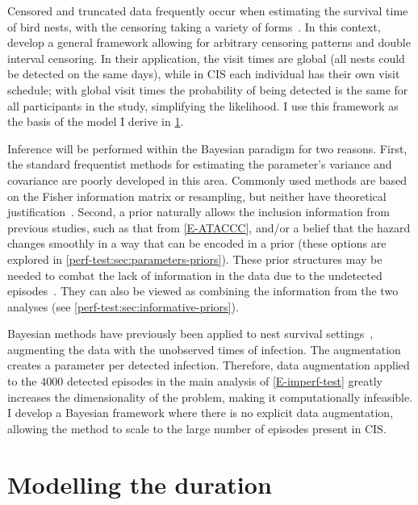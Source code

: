 \documentclass[thesis.tex]{subfiles}
\begin{document}
Censored and truncated data frequently occur when estimating the survival time of bird nests, with the censoring taking a variety of forms~\autocite{heiseyABCs}.
In this context, \textcite{heiseyModelling} develop a general framework allowing for arbitrary censoring patterns and double interval censoring.
In their application, the visit times are global (all nests could be detected on the same days), while in CIS each individual has their own visit schedule; with global visit times the probability of being detected is the same for all participants in the study, simplifying the likelihood.
I use this framework as the basis of the model I derive in \cref{perf-test:sec:model}.

Inference will be performed within the Bayesian paradigm for two reasons.
First, the standard frequentist methods for estimating the parameter's variance and covariance are poorly developed in this area.
Commonly used methods are based on the Fisher information matrix or resampling, but neither have theoretical justification~\autocite[230]{sunAnalysis}.
Second, a prior naturally allows the inclusion information from previous studies, such as that from \cref{E-ATACCC}, and/or a belief that the hazard changes smoothly in a way that can be encoded in a prior (these options are explored in \cref{perf-test:sec:parameters-priors}).
These prior structures may be needed to combat the lack of information in the data due to the undetected episodes~\autocite{caoBias}.
They can also be viewed as combining the information from the two analyses (see \cref{perf-test:sec:informative-priors}).

Bayesian methods have previously been applied to nest survival settings~\autocites{heBayesiana}{heBayesian}{caoModeling}, augmenting the data with the unobserved times of infection.
The augmentation creates a parameter per detected infection.
Therefore, data augmentation applied to the 4000 detected episodes in the main analysis of \cref{E-imperf-test} greatly increases the dimensionality of the problem, making it computationally infeasible.
I develop a Bayesian framework where there is no explicit data augmentation, allowing the method to scale to the large number of episodes present in CIS.


\section{Modelling the duration}\label{perf-test:sec:model}
\end{document}
